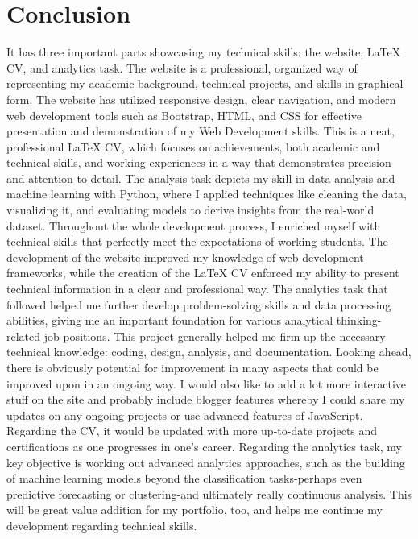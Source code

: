\documentclass[a4paper,12pt]{article}
\begin{document}
\section{Conclusion}
It has three important parts showcasing my technical skills: the website, LaTeX CV, and analytics task. The website is a professional, organized way of representing my academic background, technical projects, and skills in graphical form. The website has utilized responsive design, clear navigation, and modern web development tools such as Bootstrap, HTML, and CSS for effective presentation and demonstration of my Web Development skills. This is a neat, professional LaTeX CV, which focuses on achievements, both academic and technical skills, and working experiences in a way that demonstrates precision and attention to detail. The analysis task depicts my skill in data analysis and machine learning with Python, where I applied techniques like cleaning the data, visualizing it, and evaluating models to derive insights from the real-world dataset.
Throughout the whole development process, I enriched myself with technical skills that perfectly meet the expectations of working students. The development of the website improved my knowledge of web development frameworks, while the creation of the LaTeX CV enforced my ability to present technical information in a clear and professional way. The analytics task that followed helped me further develop problem-solving skills and data processing abilities, giving me an important foundation for various analytical thinking-related job positions. This project generally helped me firm up the necessary technical knowledge: coding, design, analysis, and documentation.
Looking ahead, there is obviously potential for improvement in many aspects that could be improved upon in an ongoing way. I would also like to add a lot more interactive stuff on the site and probably include blogger features whereby I could share my updates on any ongoing projects or use advanced features of JavaScript. Regarding the CV, it would be updated with more up-to-date projects and certifications as one progresses in one's career. Regarding the analytics task, my key objective is working out advanced analytics approaches, such as the building of machine learning models beyond the classification tasks-perhaps even predictive forecasting or clustering-and ultimately really continuous analysis. This will be great value addition for my portfolio, too, and helps me continue my development regarding technical skills.
\end{document}
